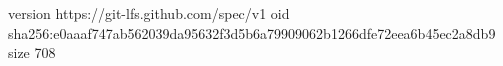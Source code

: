 version https://git-lfs.github.com/spec/v1
oid sha256:e0aaaf747ab562039da95632f3d5b6a79909062b1266dfe72eea6b45ec2a8db9
size 708
